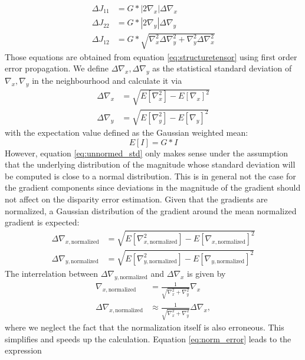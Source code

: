 \documentclass  [
  paper    = a4,
  BCOR     = 10mm,
  twoside,
  fontsize = 12pt,
  fleqn,
  toc      = bibnumbered,
  toc      = listofnumbered,
  numbers  = noendperiod,
  headings = normal,
  listof   = leveldown,
  version  = 3.03
]                                       {scrreprt}
\begin{document}
 \begin{align}\label{eq:std_struct}
 \Delta J_{11} &= G *|2\nabla_x|\Delta\nabla_x\\
 \Delta J_{22} &= G *|2\nabla_y|\Delta\nabla_y\\
 \Delta J_{12} &= G *\sqrt{\nabla_x^2\Delta\nabla_y^2 + \nabla_y^2\Delta\nabla_x^2}
 \end{align}
 Those equations are obtained from equation \ref{eq:structuretensor} using first order error propagation. We define $\Delta\nabla_x , \Delta\nabla_y$ as the statistical standard deviation of $\nabla_x, \nabla_y$ in the neighbourhood and calculate it via
 \begin{align}\label{eq:unnormed_std}
 \Delta\nabla_x &= \sqrt{E[\nabla_x^2] - E[\nabla_x]^2}\\
 \Delta\nabla_y &= \sqrt{E[\nabla_y^2] - E[\nabla_y]^2}
 \end{align}
 with the expectation value defined as the Gaussian weighted mean:
 \begin{equation}\label{key}
 E[I] = G* I
 \end{equation}
 However, equation \ref{eq:unnormed_std} only makes sense under the assumption that the underlying distribution of the magnitude whose standard deviation will be computed is close to a normal distribution. This is in general not  the case for the gradient components since deviations in the magnitude of the gradient should not affect on the disparity error estimation. Given that the gradients are normalized, a Gaussian distribution of the gradient around the mean normalized gradient is expected: 
 \begin{align}\label{eq:normed_std}
 \Delta\nabla_{x, \text{normalized}} &= \sqrt{E[\nabla_{x, \text{normalized}}^2] - E[\nabla_{x, \text{normalized}}]^2}\\
 \Delta\nabla_{y, \text{normalized}} &= \sqrt{E[\nabla_{y, \text{normalized}}^2] - E[\nabla_{y, \text{normalized}}]^2}
 \end{align}
 The interrelation between $\Delta\nabla_{y, \text{normalized}}$ and  $\Delta\nabla_x$ is given by
 \begin{align}\label{eq:norm_error}
 \nabla_{x, \text{normalized}} &= \frac{1}{\sqrt{\nabla_x^2 + \nabla_y^2}}\nabla_x \\
 \Delta \nabla_{x, \text{normalized}} &\approx  \frac{1}{\sqrt{\nabla_x^2 + \nabla_y^2}}\Delta\nabla_x,
 \end{align}
 where we neglect the fact that the normalization itself is also erroneous. This simplifies and speeds up the calculation. Equation \ref{eq:norm_error} leads to the expression
\end{document}
